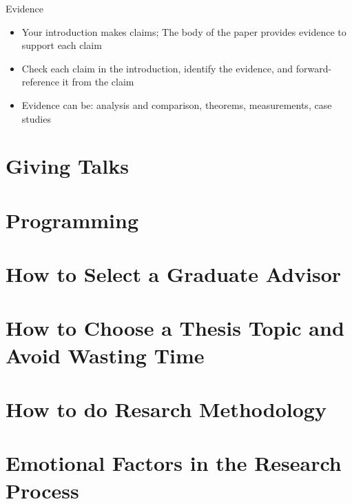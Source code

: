 Evidence
\begin{itemize}
\item Your introduction makes claims; The body of the paper provides evidence to support each claim
\item Check each claim in the introduction, identify the
evidence, and forward-reference it from the claim
\item Evidence can be: analysis and comparison, theorems,
measurements, case studies
\end{itemize}


\section{Giving Talks}

\section{Programming}

\section{How to Select a Graduate Advisor}

\section{How to Choose a Thesis Topic and Avoid Wasting Time}

\section{How to do Resarch Methodology}

\section{Emotional Factors in the Research Process}
